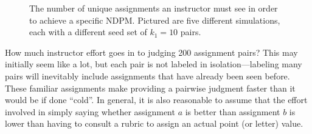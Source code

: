 \begin{figure}
  \begin{center}
  \caption{The number of unique assignments an instructor must see in order
  to achieve a specific NDPM. Pictured are five different simulations, each
  with a different seed set of $k_1 = 10$ pairs.}
  \label{fig:num-examined}
  \end{center}
\end{figure}

How much instructor effort goes in to judging 200 assignment pairs? This
may initially seem like a lot, but each pair is not labeled in
isolation---labeling many pairs will inevitably include assignments that
have already been seen before. These familiar assignments make providing a
pairwise judgment faster than it would be if done ``cold''. In general, it
is also reasonable to assume that the effort involved in simply saying
whether assignment $a$ is better than assignment $b$ is lower than having
to consult a rubric to assign an actual point (or letter) value.


